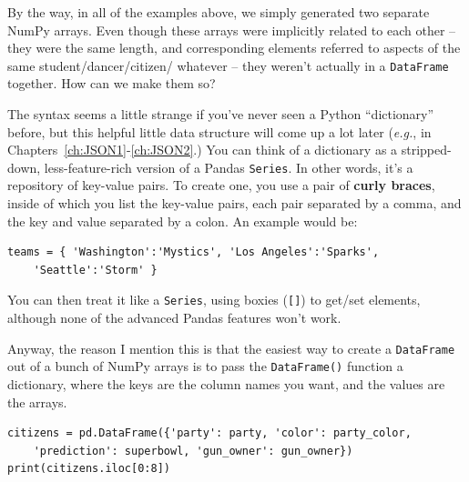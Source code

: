 By the way, in all of the examples above, we simply generated two separate
NumPy arrays. Even though these arrays were implicitly related to each other --
they were the same length, and corresponding elements referred to aspects of
the same student/dancer/citizen/ whatever -- they weren't actually in a
\texttt{DataFrame} together. How can we make them so?


\label{mentionDictionary}

The syntax seems a little strange if you've never seen a Python ``dictionary''
before, but this helpful little data structure will come up a lot later
(\textit{e.g.}, in Chapters~\ref{ch:JSON1}-\ref{ch:JSON2}.) You can think of a
dictionary as a stripped-down, less-feature-rich version of a Pandas
\texttt{Series}. In other words, it's a repository of key-value pairs. To
create one, you use a pair of \textbf{curly braces}, inside of which you list
the key-value pairs, each pair separated by a comma, and the key and value
separated by a colon. An example would be:

\label{mentionDictionary2}


\begin{Verbatim}[fontsize=\footnotesize,samepage=true,frame=single,framesep=3mm]
teams = { 'Washington':'Mystics', 'Los Angeles':'Sparks',
    'Seattle':'Storm' }
\end{Verbatim}

You can then treat it like a \texttt{Series}, using boxies (\texttt{[]}) to
get/set elements, although none of the advanced Pandas features won't work.

Anyway, the reason I mention this is that the easiest way to create a
\texttt{DataFrame} out of a bunch of NumPy arrays is to pass the
\texttt{DataFrame()} function a dictionary, where the keys are the column
names you want, and the values are the arrays.

\begin{Verbatim}[fontsize=\footnotesize,samepage=true,frame=single,framesep=3mm]
citizens = pd.DataFrame({'party': party, 'color': party_color,
    'prediction': superbowl, 'gun_owner': gun_owner})
print(citizens.iloc[0:8])
\end{Verbatim}
\vspace{-.2in}


